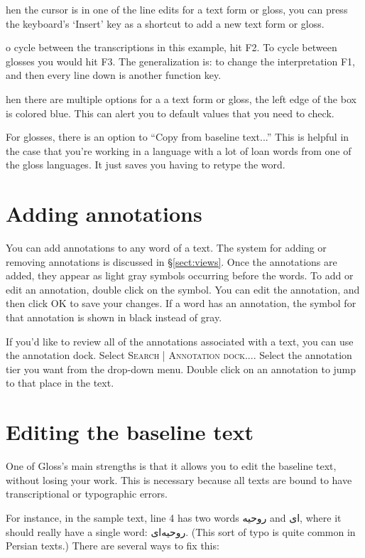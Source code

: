 \documentclass[oneside]{book}
\def\menu#1{\textsc{#1}}
\def\menu#1#2{\textsc{#1 | #2}}
\def\gloss{\textsf{Gloss}}
\def\sect#1{§\ref{#1}}
\def\p#1{\textfarsi{#1}}
\def\tip#1\par{\medskip\noindent\fcolorbox{black}{light-gray}{\parbox{\textwidth}{#1}}\par\medskip}
\begin{document}
\tip When the cursor is in one of the line edits for a text form or gloss, you can press the keyboard's `Insert' key as a shortcut to add a new text form or gloss.

\tip To cycle between the transcriptions in this example, hit F2. To cycle between glosses you would hit F3. The generalization is: to change the interpretation F1, and then every line down is another function key.

\tip When there are multiple options for a a text form or gloss, the left edge of the box is colored blue. This can alert you to default values that you need to check.

For glosses, there is an option to ``Copy from baseline text...'' This is helpful in the case that you're working in a language with a lot of loan words from one of the gloss languages. It just saves you having to retype the word.

\section{Adding annotations}
You can add annotations to any word of a text. The system for adding or removing annotations is discussed in \sect{sect:views}. Once the annotations are added, they appear as light gray symbols occurring before the words. To add or edit an annotation, double click on the symbol. You can edit the annotation, and then click OK to save your changes. If a word has an annotation, the symbol for that annotation is shown in black instead of gray.

If you'd like to review all of the annotations associated with a text, you can use the annotation dock. Select \menu{Search}{Annotation dock...}. Select the annotation tier you want from the drop-down menu. Double click on an annotation to jump to that place in the text.

\section{Editing the baseline text}
One of \gloss's main strengths is that it allows you to edit the baseline text, without losing your work. This is necessary because all texts are bound to have transcriptional or typographic errors.

For instance, in the sample text, line 4 has two words \p{روحیه} and \p{ای}, where it should really have a single word: \p{روحیه‌ای}. (This sort of typo is quite common in Persian texts.) There are several ways to fix this:
\end{document}
